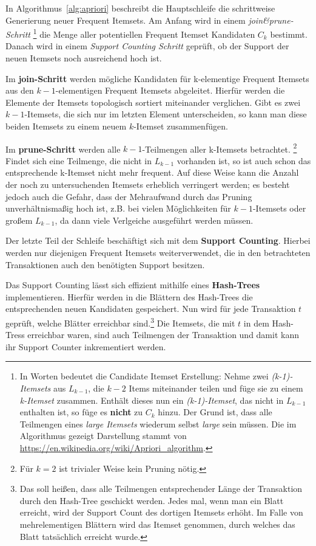 In Algorithmus~\ref{alg:apriori} beschreibt die Hauptschleife die schrittweise 
Generierung neuer Frequent Itemsets. Am Anfang wird in einem \textit{join\&prune-
Schritt}
\footnote{In Worten bedeutet die Candidate
Itemset Erstellung: Nehme zwei \textit{(k-1)-Itemsets} aus \(L_{k-1}\), die \(k-2\) Items
miteinander teilen und füge sie zu einem \textit{k-Itemset} zusammen. Enthält dieses
nun ein \textit{(k-1)-Itemset}, das nicht in \(L_{k-1}\) enthalten ist, so füge es 
\textbf{nicht} zu \(C_k\) hinzu. Der Grund ist, dass alle Teilmengen eines 
\textit{large Itemsets} wiederum selbst \textit{large} sein müssen. Die im 
Algorithmus gezeigt Darstellung stammt von 
\url{https://en.wikipedia.org/wiki/Apriori\_algorithm}. }
die Menge aller potentiellen Frequent Itemset Kandidaten \(C_k\) bestimmt.
Danach wird in einem \textit{Support Counting Schritt} geprüft, ob der Support
der neuen Itemsets noch ausreichend hoch ist.

Im \textbf{join-Schritt} werden mögliche Kandidaten für k-elementige Frequent Itemsets
aus den \(k-1\)-elementigen Frequent Itemsets abgeleitet. Hierfür werden die
Elemente der Itemsets topologisch sortiert miteinander verglichen. Gibt es 
zwei \(k-1\)-Itemsets, die sich nur im letzten Element unterscheiden, so kann man 
diese beiden Itemsets zu einem neuem \(k\)-Itemset zusammenfügen.

Im \textbf{prune-Schritt} werden alle \(k-1\)-Teilmengen aller k-Itemsets betrachtet.
\footnote{Für \(k=2\) ist trivialer Weise kein Pruning nötig.}
Findet sich eine Teilmenge, die nicht in \(L_{k-1}\) vorhanden ist, so ist auch schon
das entsprechende k-Itemset nicht mehr frequent. Auf diese Weise kann die Anzahl
der noch zu untersuchenden Itemsets erheblich verringert werden; es besteht jedoch
auch die Gefahr, dass der Mehraufwand durch das Pruning unverhältnismaßig hoch
ist, z.B. bei vielen Möglichkeiten für \(k-1\)-Itemsets oder großem \(L_{k-1}\),
da dann viele Verlgeiche ausgeführt werden müssen.

Der letzte Teil der Schleife beschäftigt sich mit dem \textbf{Support Counting}.
Hierbei werden nur diejenigen Frequent Itemsets weiterverwendet, die in den
betrachteten Transaktionen auch den benötigten Support besitzen.

Das Support Counting lässt sich effizient mithilfe eines \textbf{Hash-Trees} implementieren.
Hierfür werden in die Blättern des Hash-Trees die entsprechenden neuen
Kandidaten gespeichert. Nun wird für jede Transaktion \(t\) geprüft, welche
Blätter erreichbar sind.\footnote{Das soll heißen, dass alle Teilmengen entsprechender Länge
der Transaktion durch den Hash-Tree geschickt werden. Jedes mal, wenn man ein Blatt erreicht,
wird der Support Count des dortigen Itemsets erhöht. Im Falle von mehrelementigen Blättern wird
das Itemset genommen, durch welches das Blatt tatsächlich erreicht wurde.}
Die Itemsets, die mit \(t\) in dem Hash-Tress erreichbar waren, sind auch Teilmengen
der Transaktion und damit kann ihr Support Counter inkrementiert werden.

